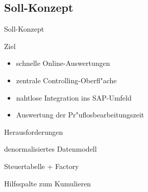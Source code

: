 \subsection{Soll-Konzept}
\begin{frame}[<+->]{Soll-Konzept}
	\begin{block}{Ziel}
		\begin{itemize}
			\item schnelle Online-Auswertungen
			\item zentrale Controlling-Oberfl"ache
			\item nahtlose Integration ins SAP-Umfeld
			\item Auswertung der Pr"uflosbearbeitungszeit 
		\end{itemize}
	\end{block}
	
	\begin{block}{Herausforderungen}
		\begin{description}
			\item[Performance]{denormalisiertes Datenmodell}
			\item[Erweiterbarkeit]{Steuertabelle + Factory}
			\item[Z"ahlung im ALV Grid]{Hilfsspalte zum Kumulieren}
		\end{description}
	\end{block}
\end{frame}


